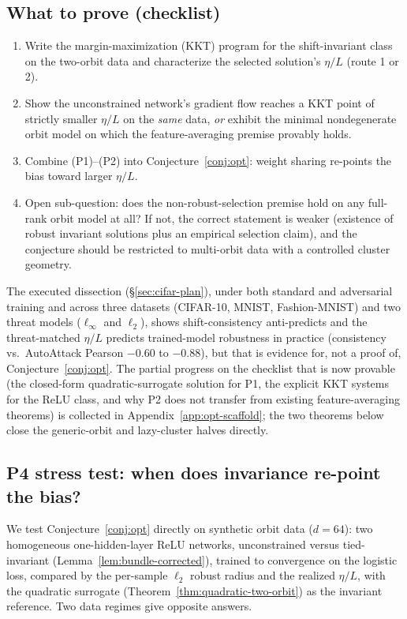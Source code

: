 \documentclass[11pt]{article}
\theoremstyle{plain}
\theoremstyle{definition}
\theoremstyle{remark}
\begin{document}
\subsection{What to prove (checklist)}
\begin{enumerate}[leftmargin=1.4em]
\item[(P1)] Write the margin-maximization (KKT) program for the shift-invariant class on the two-orbit data and characterize the selected solution's $\eta/L$ (route 1 or 2).
\item[(P2)] Show the unconstrained network's gradient flow reaches a KKT point of strictly smaller $\eta/L$ on the \emph{same} data, \emph{or} exhibit the minimal nondegenerate orbit model on which the \citet{Frei2023} feature-averaging premise provably holds.
\item[(P3)] Combine (P1)--(P2) into Conjecture~\ref{conj:opt}: weight sharing re-points the bias toward larger $\eta/L$.
\item[(P4)] Open sub-question: does the non-robust-selection premise hold on any full-rank orbit model at all?  If not, the correct statement is weaker (existence of robust invariant solutions plus an empirical selection claim), and the conjecture should be restricted to multi-orbit data with a controlled cluster geometry.
\end{enumerate}
The executed dissection (\S\ref{sec:cifar-plan}), under both standard and adversarial training and across three datasets (CIFAR-10, MNIST, Fashion-MNIST) and two threat models ($\ell_\infty$ and $\ell_2$), shows shift-consistency anti-predicts and the threat-matched $\eta/L$ predicts trained-model robustness in practice (consistency vs.\ AutoAttack Pearson $-0.60$ to $-0.88$), but that is evidence for, not a proof of, Conjecture~\ref{conj:opt}.  The partial progress on the checklist that is now provable (the closed-form quadratic-surrogate solution for P1, the explicit KKT systems for the ReLU class, and why P2 does not transfer from existing feature-averaging theorems) is collected in Appendix~\ref{app:opt-scaffold}; the two theorems below close the generic-orbit and lazy-cluster halves directly.

\subsection{P4 stress test: when does invariance re-point the bias?}\label{sec:p4}
We test Conjecture~\ref{conj:opt} directly on synthetic orbit data ($d=64$): two homogeneous one-hidden-layer ReLU networks, unconstrained versus tied-invariant (Lemma~\ref{lem:bundle-corrected}), trained to convergence on the logistic loss, compared by the per-sample $\ell_2$ robust radius and the realized $\eta/L$, with the quadratic surrogate (Theorem~\ref{thm:quadratic-two-orbit}) as the invariant reference.  Two data regimes give opposite answers.
\end{document}
